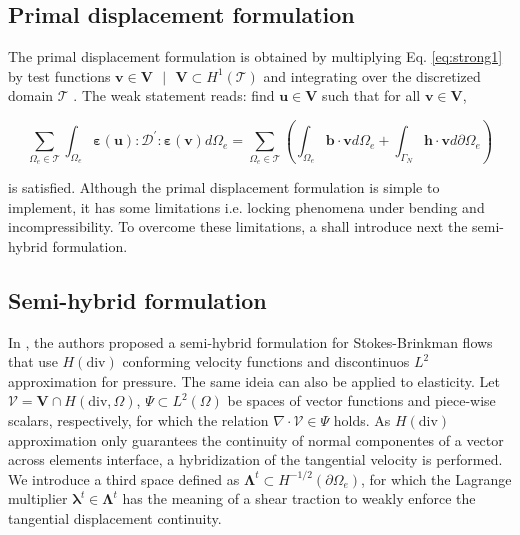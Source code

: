\documentclass{wccm2024}
\begin{document}
\subsection{Primal displacement formulation}

The primal displacement formulation is obtained by multiplying Eq. \eqref{eq:strong1} by test functions $\mathbf{v} \in \mathbf{V}\text{ } | \text{ }\mathbf{V} \subset H^1(\mathcal{T})$ and integrating over the discretized domain $\mathcal{T}$ \cite{becker1981finite}. The weak statement reads: find $\mathbf{u} \in \mathbf{V}$ such that for all $\mathbf{v} \in \mathbf{V}$,

\begin{equation} \label{eq:primal-displacement}
    \sum_{\Omega_e \in \mathcal{T}} \int_{\Omega_e} \boldsymbol{\varepsilon}(\mathbf{u}) : \mathcal{D}^{'} : \boldsymbol{\varepsilon}(\mathbf{v}) d\Omega_e = \sum_{\Omega_e \in \mathcal{T}} \left(\int_{\Omega_e} \mathbf{b} \cdot \mathbf{v} d\Omega_e + \int_{\Gamma_N} \mathbf{h} \cdot \mathbf{v} d\partial\Omega_e \right)
\end{equation}

\noindent is satisfied. Although the primal displacement formulation is simple to implement, it has some limitations i.e. locking phenomena under bending and incompressibility. To overcome these limitations, a shall introduce next the semi-hybrid formulation.

\subsection{Semi-hybrid formulation}

In \cite{carvalho2024semi}, the authors proposed a semi-hybrid formulation for Stokes-Brinkman flows that use $H(\text{div})$ conforming velocity functions and discontinuos $L^2$ approximation for pressure. The same ideia can also be applied to elasticity. Let $\mathcal{V} = \mathbf{V}\cap H(\text{div},\Omega)$, $\Psi \subset L^2(\Omega)$ be spaces of vector functions and piece-wise scalars, respectively, for which the relation $\nabla \cdot \mathcal{V} \in \Psi$ holds. As $H(\text{div})$ approximation only guarantees the continuity of normal componentes of a vector across elements interface, a hybridization of the tangential velocity is performed. We introduce a third space defined as $\boldsymbol{\Lambda}^t \subset H^{-1/2}(\partial\Omega_e)$, for which the Lagrange multiplier $\boldsymbol{\lambda}^t \in \boldsymbol{\Lambda}^t$ has the meaning of a shear traction to weakly enforce the tangential displacement continuity. 
\end{document}
